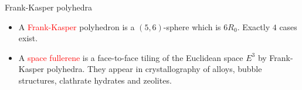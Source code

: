 \documentclass[%
pdf,
colorBG,
slideColor,
]{prosper}
\begin{document}
\begin{slide}{Frank-Kasper polyhedra}
\begin{itemize}
\item A \textcolor{red}{Frank-Kasper} polyhedron is a $(5,6)$-sphere which is $6R_0$. Exactly $4$ cases exist.
\item A \textcolor{red}{space fullerene} is a face-to-face tiling of the Euclidean space $E^3$ by Frank-Kasper polyhedra. They appear in crystallography of alloys, bubble structures, clathrate hydrates and zeolites.
\end{itemize}

\begin{center}
\begin{minipage}{4.5cm}
\begin{minipage}{20mm}
\centering
\epsfxsize=17mm
\par
\end{minipage}
\hfill\begin{minipage}{20mm}
\centering
\epsfxsize=20mm
\par
\end{minipage}
\begin{minipage}{20mm}
\centering
\epsfxsize=20mm
\par
\end{minipage}
\hfill\begin{minipage}{20mm}
\centering
\epsfxsize=20mm
\par
\end{minipage}
\end{minipage}
\begin{minipage}{4.5cm}
\centering
{}\par
\end{minipage}
\end{center}

\end{slide}
\end{document}
